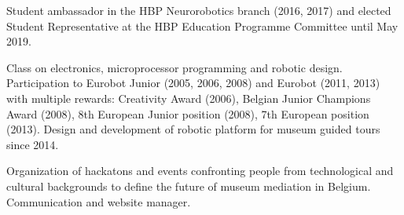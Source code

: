 \documentclass[a4paper]{deedy-resume} %
\begin{document}
Student ambassador in the HBP Neurorobotics branch (2016, 2017) and elected Student Representative at the HBP Education Programme Committee until May 2019.

\vspace{12pt}


Class on electronics, microprocessor programming and robotic design. Participation to Eurobot Junior (2005, 2006, 2008) and Eurobot (2011, 2013) with multiple rewards: Creativity Award (2006), Belgian Junior Champions Award (2008), 8th European Junior position (2008), 7th European position (2013). Design and development of robotic platform for museum guided tours since 2014.

\vspace{12pt}


Organization of hackatons and events confronting people from technological and cultural backgrounds to define the future of museum mediation in Belgium. Communication and website manager.

\vspace{10pt}
\end{document}
